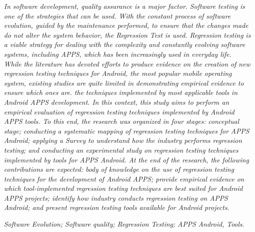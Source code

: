 \abstract
\textit{In software development, quality assurance is a major factor. Software testing is one of the strategies that can be used. With the constant process of software evolution, guided by the maintenance performed, to ensure that the changes made do not alter the system behavior, the Regression Test is used. Regression testing is a viable strategy for dealing with the complexity and constantly evolving software systems, including APPS, which has been increasingly used in everyday life. While the literature has devoted efforts to produce evidence on the creation of new regression testing techniques for Android, the most popular mobile operating system, existing studies are quite limited in demonstrating empirical evidence to ensure which ones are. the techniques implemented by most applicable tools in Android \ac {APPS} development. In this context, this study aims to perform an empirical evaluation of regression testing techniques implemented by Android \ac {APPS} tools. To this end, the research was organized in four stages: conceptual stage; conducting a systematic mapping of regression testing techniques for \ac {APPS} Android; applying a Survey to understand how the industry performs regression testing; and conducting an experimental study on regression testing techniques implemented by tools for \ac {APPS} Android. At the end of the research, the following contributions are expected: body of knowledge on the use of regression testing techniques for the development of Android \ac {APPS}; provide empirical evidence on which tool-implemented regression testing techniques are best suited for Android \ac {APPS} projects; identify how industry conducts regression testing on \ac {APPS} Android; and present regression testing tools available for Android projects}.

\begin{keywords}
\textit{Software Evolution; Software quality; Regression Testing; APPS Android, Tools}.
\end{keywords}
